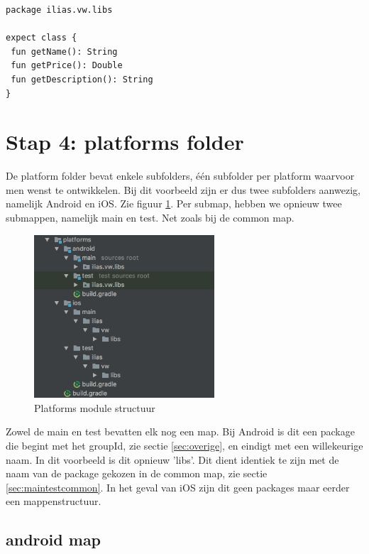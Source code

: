 \begin{lstlisting}
package ilias.vw.libs

expect class {
 fun getName(): String
 fun getPrice(): Double
 fun getDescription(): String
}
\end{lstlisting}

\section{Stap 4: platforms folder}
De platform folder bevat enkele subfolders, één subfolder per platform waarvoor men wenst te ontwikkelen. Bij dit voorbeeld zijn er dus twee subfolders aanwezig, namelijk Android en iOS. Zie figuur \ref{fig:stap4-structuur}. Per submap, hebben we opnieuw twee submappen, namelijk main en test. Net zoals bij de common map. 

\begin{figure} [ht]
	\centering
	\includegraphics[width=0.60\textwidth]{img/stap4-structuur.png}
	\caption{Platforms module structuur}
	\label{fig:stap4-structuur}
\end{figure}

Zowel de main en test bevatten elk nog een map. Bij Android is dit een package die begint met het groupId, zie sectie \ref{sec:overige}, en eindigt met een willekeurige naam. In dit voorbeeld is dit opnieuw 'libs'. Dit dient identiek te zijn met de naam van de package gekozen in de common map, zie sectie \ref{sec:maintestcommon}. In het geval van iOS zijn dit geen packages maar eerder een mappenstructuur.

\subsection{android map}
